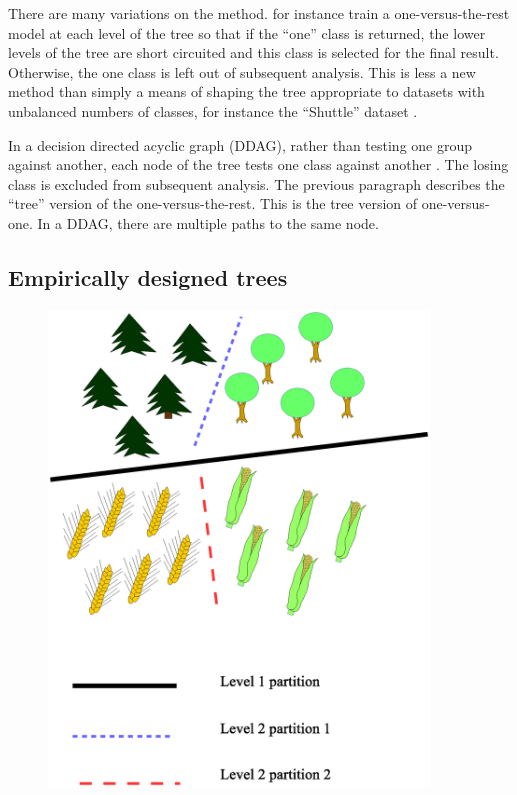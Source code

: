 \documentclass{article}
\begin{document}
There are many variations on the method. \citet{Ramanan_etal2007} for instance train a 
one-versus-the-rest model at each level of the tree so that if the ``one''
class is returned, the lower levels of the tree are short circuited
and this class is selected for the final result. Otherwise, the one class
is left out of subsequent analysis. This is less a new method than simply
a means of shaping the tree appropriate to datasets with unbalanced
numbers of classes, for instance the ``Shuttle'' dataset \citep{King_etal1995}.

In a decision directed acyclic graph (DDAG), 
rather than testing one group against another, 
each node of the tree tests one class against another \citep{Platt_etal2000}. 
The losing class is excluded from subsequent analysis. 
The previous paragraph describes the ``tree'' version of the one-versus-the-rest. 
This is the tree version of one-versus-one. 
In a DDAG, there are multiple paths to the same node.

\subsection{Empirically designed trees}

\begin{figure}
	\includegraphics[width=0.9\textwidth]{landclasstree.eps}
	\label{landclasstree}
\end{figure}
\end{document}

